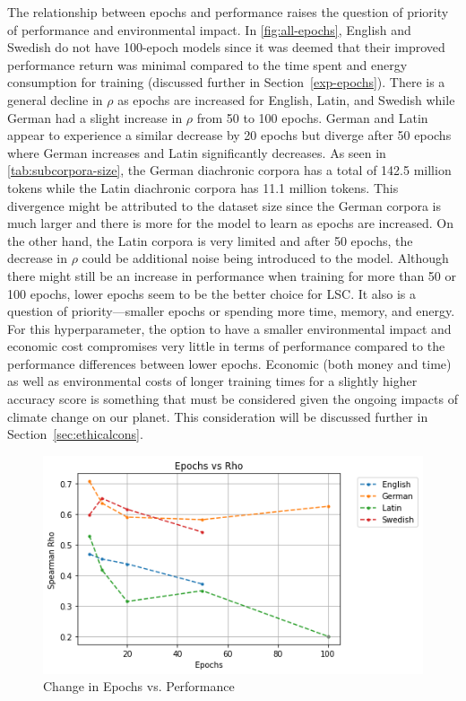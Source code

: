 The relationship between epochs and performance raises the question of priority of performance and environmental impact. In \autoref{fig:all-epochs}, English and Swedish do not have 100-epoch models since it was deemed that their improved performance return was minimal compared to the time spent and energy consumption for training (discussed further in Section~\ref{exp-epochs}). There is a general decline in $\rho$ as epochs are increased for English, Latin, and Swedish while German had a slight increase in $\rho$ from 50 to 100 epochs. German and Latin appear to experience a similar decrease by 20 epochs but diverge after 50 epochs where German increases and Latin significantly decreases. As seen in \autoref{tab:subcorpora-size}, the German diachronic corpora has a total of 142.5 million tokens while the Latin diachronic corpora has 11.1 million tokens. This divergence might be attributed to the dataset size since the German corpora is much larger and there is more for the model to learn as epochs are increased.  On the other hand, the Latin corpora is very limited and after 50 epochs, the decrease in $\rho$ could be additional noise being introduced to the model. Although there might still be an increase in performance when training for more than 50 or 100 epochs, lower epochs seem to be the better choice for LSC. It also is a question of priority—smaller epochs or spending more time, memory, and energy. For this hyperparameter, the option to have a smaller environmental impact and economic cost compromises very little in terms of performance compared to the performance differences between lower epochs. Economic (both money and time) as well as environmental costs of longer training times for a slightly higher accuracy score is something that must be considered given the ongoing impacts of climate change on our planet. This consideration will be discussed further in Section~\ref{sec:ethicalcons}.



\begin{figure}[h]
  \centering
  \includegraphics[width=.8\linewidth]{sections/figures/epochs_all.png}
  \caption{Change in Epochs vs. Performance}
  \label{fig:all-epochs}
\end{figure}

